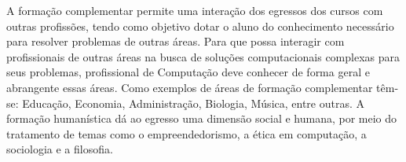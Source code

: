 \documentclass[
	12pt,				%
	openright,			%
  oneside,     %
	a4paper,			%
	english,			%
	french,				%
	spanish,			%
	brazil				%
	]{abntex2}
\begin{document}
A formação complementar permite uma interação dos egressos dos cursos com outras profissões, tendo como objetivo dotar o aluno do conhecimento necessário para resolver problemas de outras áreas. Para que possa interagir com profissionais de outras áreas na busca de soluções computacionais complexas para seus problemas, profissional de Computação deve conhecer de forma geral e abrangente essas áreas. Como exemplos de áreas de formação complementar têm-se: Educação, Economia, Administração, Biologia, Música, entre outras. A formação humanística dá ao egresso uma dimensão social e humana, por meio do tratamento de temas como o empreendedorismo, a ética em computação, a sociologia e a filosofia. 

\end{document}
